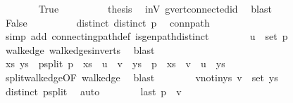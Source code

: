 \begin{isabellebody}
\ \ \ \ \ \ \isamarkupfalse%
\ True\isanewline
\ \ \ \ \ \ \isamarkupfalse%
\ \isamarkupfalse%
\ {\isacharquery}{\kern0pt}thesis\ \isamarkupfalse%
\ inV\ g{\isacharprime}{\kern0pt}{\isachardot}{\kern0pt}vert{\isacharunderscore}{\kern0pt}connected{\isacharunderscore}{\kern0pt}id\ \isamarkupfalse%
\ blast\isanewline
\ \ \ \ \isamarkupfalse%
\isanewline
\ \ \ \ \ \ \isamarkupfalse%
\ False\isanewline
\ \ \ \ \ \ \isamarkupfalse%
\ \isamarkupfalse%
\ distinct{\isacharcolon}{\kern0pt}\ {\isachardoublequoteopen}distinct\ p{\isachardoublequoteclose}\ \isamarkupfalse%
\ conn{\isacharunderscore}{\kern0pt}path\ \isamarkupfalse%
\ {\isacharparenleft}{\kern0pt}simp\ add{\isacharcolon}{\kern0pt}\ connecting{\isacharunderscore}{\kern0pt}path{\isacharunderscore}{\kern0pt}def\ is{\isacharunderscore}{\kern0pt}gen{\isacharunderscore}{\kern0pt}path{\isacharunderscore}{\kern0pt}distinct{\isacharparenright}{\kern0pt}\isanewline
\ \ \ \ \ \ \isamarkupfalse%
\ {\isachardoublequoteopen}u\ {\isasymin}\ set\ p{\isachardoublequoteclose}\ \isamarkupfalse%
\ walk{\isacharunderscore}{\kern0pt}edge\ walk{\isacharunderscore}{\kern0pt}edges{\isacharunderscore}{\kern0pt}in{\isacharunderscore}{\kern0pt}verts\ \isamarkupfalse%
\ blast\isanewline
\ \ \ \ \ \ \isamarkupfalse%
\ xs\ ys\ \ p{\isacharunderscore}{\kern0pt}split{\isacharcolon}{\kern0pt}\ {\isachardoublequoteopen}p\ {\isacharequal}{\kern0pt}\ xs\ {\isacharat}{\kern0pt}\ u\ {\isacharhash}{\kern0pt}\ v\ {\isacharhash}{\kern0pt}\ ys\ {\isasymor}\ p\ {\isacharequal}{\kern0pt}\ xs\ {\isacharat}{\kern0pt}\ v\ {\isacharhash}{\kern0pt}\ u\ {\isacharhash}{\kern0pt}\ ys{\isachardoublequoteclose}\ \isamarkupfalse%
\ split{\isacharunderscore}{\kern0pt}walk{\isacharunderscore}{\kern0pt}edge{\isacharbrackleft}{\kern0pt}OF\ walk{\isacharunderscore}{\kern0pt}edge{\isacharbrackright}{\kern0pt}\ \isamarkupfalse%
\ blast\isanewline
\ \ \ \ \ \ \isamarkupfalse%
\ v{\isacharunderscore}{\kern0pt}notin{\isacharunderscore}{\kern0pt}ys{\isacharcolon}{\kern0pt}\ {\isachardoublequoteopen}v\ {\isasymnotin}\ set\ ys{\isachardoublequoteclose}\ \isamarkupfalse%
\ distinct\ p{\isacharunderscore}{\kern0pt}split\ \isamarkupfalse%
\ auto\isanewline
\ \ \ \ \ \ \isamarkupfalse%
\ {\isachardoublequoteopen}last\ p\ {\isacharequal}{\kern0pt}\ v{\isachardoublequoteclose}\ \isamarkupfalse%

\end{isabellebody}
